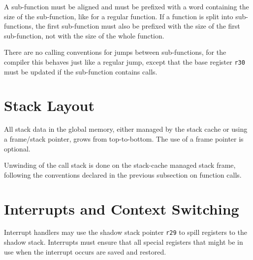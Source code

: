 \documentclass[a4paper,fontsize=10pt,twoside,DIV15,BCOR12mm,headinclude=true,footinclude=false,pagesize,bibtotoc]{scrbook}
\newcommand{\comment}[3]{

\textsf{\textbf{#1}} {\color{#3}#2}}
\newcommand{\martin}[1]{\comment{Martin}{#1}{Blue}}
\newcommand{\stefan}[1]{\comment{Stefan}{#1}{RoyalPurple}}
\newcommand{\jack}[1]{\comment{Jack}{#1}{Magenta}}
\renewcommand{\martin}[1]{}
\renewcommand{\stefan}[1]{}
\renewcommand{\jack}[1]{}
\begin{document}
A sub-function must be aligned and must be prefixed with a word containing the size of the sub-function,
like for a regular function. If a function is split into sub-functions, the first sub-function
must also be prefixed with the size of the first sub-function, not with the size of the whole function.

There are no calling conventions for jumps between sub-functions, for the compiler
this behaves just like a regular jump, except that the base register \texttt{r30} must
be updated if the sub-function contains calls.



\stefan{We need to define how the call and local branch with cache fill get the size of the code to load. A word
containing the size at the target address, or prior to the target address? (including or excluding the size word?)}

\jack{I'd store the code size at the target address and have the
method itself start at an offset +4 or +8 from that place. I also
suggest storing the stack size here too. Could fit into the same
32-bit word (since I'd guess the local memory size limits us to
$<64$k code and $<64$k stack in a single method anyway).}

\martin{Agree for plain C code where there is no data structure
further describing a function. In the JOP JVM I have the luxury
to have those sizes as part of the virtual method dispatch table.
One indirection is there needed anyway, so why not having those
data there.}

\section{Stack Layout}

All stack data in the global memory, either managed by the stack cache or using
a frame/stack pointer, grows from top-to-bottom. The use of a frame pointer is
optional.

Unwinding of the call stack is done on the stack-cache managed stack frame,
following the conventions declared in the previous subsection on function calls.

\section{Interrupts and Context Switching}

Interrupt handlers may use the shadow stack pointer \texttt{r29} to spill registers
to the shadow stack. Interrupts must ensure that all special registers that might be in use
when the interrupt occurs are saved and restored.
\end{document}
